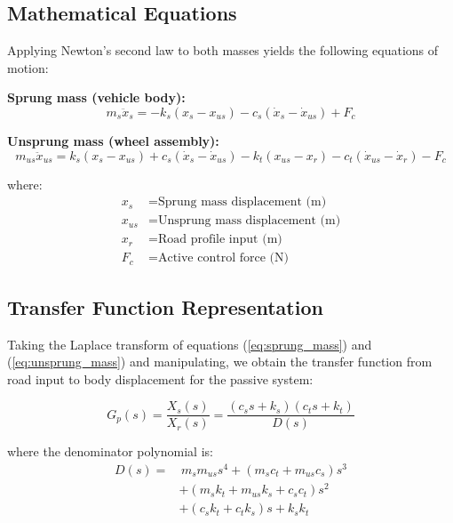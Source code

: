 \documentclass[12pt,a4paper]{article}
\begin{document}
\subsection{Mathematical Equations}

Applying Newton's second law to both masses yields the following equations of motion:

\textbf{Sprung mass (vehicle body):}
\begin{equation}
    m_s \ddot{x}_s = -k_s(x_s - x_{us}) - c_s(\dot{x}_s - \dot{x}_{us}) + F_c
    \label{eq:sprung_mass}
\end{equation}

\textbf{Unsprung mass (wheel assembly):}
\begin{equation}
    m_{us} \ddot{x}_{us} = k_s(x_s - x_{us}) + c_s(\dot{x}_s - \dot{x}_{us}) - k_t(x_{us} - x_r) - c_t(\dot{x}_{us} - \dot{x}_r) - F_c
    \label{eq:unsprung_mass}
\end{equation}

where:
\begin{align*}
    x_s &= \text{Sprung mass displacement (m)} \\
    x_{us} &= \text{Unsprung mass displacement (m)} \\
    x_r &= \text{Road profile input (m)} \\
    F_c &= \text{Active control force (N)}
\end{align*}

\subsection{Transfer Function Representation}

Taking the Laplace transform of equations (\ref{eq:sprung_mass}) and (\ref{eq:unsprung_mass}) and manipulating, we obtain the transfer function from road input to body displacement for the passive system:

\begin{equation}
    G_p(s) = \frac{X_s(s)}{X_r(s)} = \frac{(c_s s + k_s)(c_t s + k_t)}{D(s)}
    \label{eq:passive_tf}
\end{equation}

where the denominator polynomial is:
\begin{align}
    D(s) = &\, m_s m_{us} s^4 + (m_s c_t + m_{us} c_s) s^3 \nonumber \\
    &+ (m_s k_t + m_{us} k_s + c_s c_t) s^2 \nonumber \\
    &+ (c_s k_t + c_t k_s) s + k_s k_t
\end{align}
\end{document}
